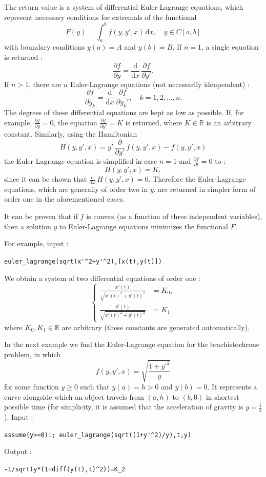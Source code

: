 \documentclass[a4paper,11pt]{book}
\begin{document}
The return value is a system of differential Euler-Lagrange equations, which represent necessary conditions for extremals of the functional
\[ F(y)=\int_a^bf(y,y',x)\,\mathrm{d}x,\quad y\in C[a,b] \]
with boundary conditions $y(a)=A$ and $y(b)=B$. If $n=1$, a single equation is returned :
\[ \frac{\partial f}{\partial y}=\frac{\mathrm{d}}{\mathrm{d}x}\,\frac{\partial f}{\partial y'}. \]
If $n>1$, there are $n$ Euler-Lagrange equations (not necessarily idenpendent) :
\[ \frac{\partial f}{\partial y_k}=\frac{\mathrm{d}}{\mathrm{d}x}\,\frac{\partial f}{\partial y_k'},\quad k=1,2,\dots,n. \]
The degrees of these differential equations are kept as low as possible. If, for example, $\frac{\partial f}{\partial y}=0$, the equation $\frac{\partial f}{\partial y'}=K$ is returned, where $K\in\mathbb{R}$ is an arbitrary constant. Similarly, using the Hamiltonian
\[ H(y,y',x)=y'\,\frac{\partial}{\partial y'}\,f(y,y',x)-f(y,y',x) \]
the Euler-Lagrange equation is simplified in case $n=1$ and $\frac{\partial f}{\partial t}=0$ to :
\[ H(y,y',x)=K, \]
since it can be shown that $\frac{\mathrm{d}}{\mathrm{d}x}\,H(y,y',x)=0$. Therefore the Euler-Lagrange equations, which are generally of order two in $y$, are returned in simpler form of order one in the aforementioned cases.

It can be proven that if $f$ is convex (as a function of three independent variables), then a solution $y$ to Euler-Lagrange equations minimizes the functional $F$.

For example, input :
\begin{center}
  \tt euler\_lagrange(sqrt(x\verb|'^|2+y\verb|'^|2),[x(t),y(t)])
\end{center}
We obtain a system of two differential equations of order one :
\[ \begin{cases}\frac{x'(t)}{\sqrt{x'(t)^2+y'(t)^2}}&=K_0,\\\frac{y'(t)}{\sqrt{x'(t)^2+y'(t)^2}}&=K_1\end{cases} \]
where $K_0,K_1\in\mathbb{R}$ are arbitrary (these constants are generated automatically).

In the next example we find the Euler-Lagrange equation for the brachistochrone problem, in which
\[ f(y,y',x)=\sqrt{\frac{1+y'^2}{y}} \]
for some function $y\geq 0$ such that $y(a)=h>0$ and $y(b)=0$. It represents a curve alongside which an object travels from $(a,h)$ to $(b,0)$ in shortest possible time (for simplicity, it is assumed that the acceleration of gravity is $g=\frac{1}{2}$). Input :
\begin{center}
  \tt assume(y>=0):; euler\_lagrange(sqrt((1+y\verb|'^|2)/y),t,y)
\end{center}
Output :
\begin{center}
  \tt -1/sqrt(y*(1+diff(y(t),t)\verb|^|2))=K\_2
\end{center}
\end{document}
